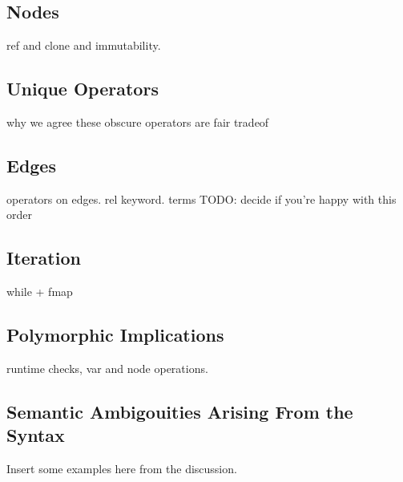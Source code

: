 \subsection{Nodes}
ref and clone and immutability.


\subsection{Unique Operators}
why we agree these obscure operators are fair tradeof

\subsection{Edges}
operators on edges.
rel keyword.
terms
TODO: decide if you're happy with this order


\subsection{Iteration}
while + fmap

\subsection{Polymorphic Implications}
runtime checks, var and node operations.

\subsection{Semantic Ambigouities Arising From the Syntax}
Insert some examples here from the discussion.